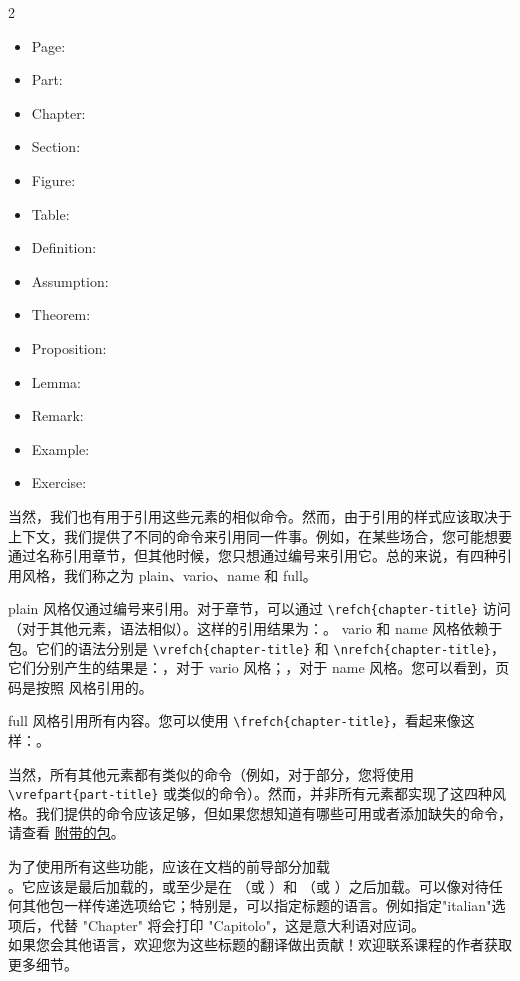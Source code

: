 \begin{multicols}{2}
\setlength{\columnseprule}{0pt}
\begin{itemize}
	\item Page: 
	\item Part: 
	\item Chapter: 
	\item Section: 
	\item Figure: 
	\item Table: 
	\item Definition: 
	\item Assumption: 
	\item Theorem: 
	\item Proposition: 
	\item Lemma: 
	\item Remark: 
	\item Example: 
	\item Exercise: 
\end{itemize}
\end{multicols}

当然，我们也有用于引用这些元素的相似命令。然而，由于引用的样式应该取决于上下文，我们提供了不同的命令来引用同一件事。例如，在某些场合，您可能想要通过名称引用章节，但其他时候，您只想通过编号来引用它。总的来说，有四种引用风格，我们称之为 plain、vario、name 和 full。

plain 风格仅通过编号来引用。对于章节，可以通过 \lstinline|\refch{chapter-title}| 访问（对于其他元素，语法相似）。这样的引用结果为：。
vario 和 name 风格依赖于  包。它们的语法分别是 \lstinline|\vrefch{chapter-title}| 和 \lstinline|\nrefch{chapter-title}|，它们分别产生的结果是：，对于 vario 风格；，对于 name 风格。您可以看到，页码是按照  风格引用的。

full 风格引用所有内容。您可以使用 \lstinline|\frefch{chapter-title}|，看起来像这样：。

当然，所有其他元素都有类似的命令（例如，对于部分，您将使用 \lstinline|\vrefpart{part-title}| 或类似的命令）。然而，并非所有元素都实现了这四种风格。我们提供的命令应该足够，但如果您想知道有哪些可用或者添加缺失的命令，请查看 \href{styles/kaorefs.sty}{附带的包}。

为了使用所有这些功能，应该在文档的前导部分加载\\ 。它应该是最后加载的，或至少是在 （或 ）和 （或 ）之后加载。可以像对待任何其他包一样传递选项给它；特别是，可以指定标题的语言。例如指定"italian"选项后，代替 "Chapter" 将会打印 "Capitolo"，这是意大利语对应词。\\ 如果您会其他语言，欢迎您为这些标题的翻译做出贡献！欢迎联系课程的作者获取更多细节。

